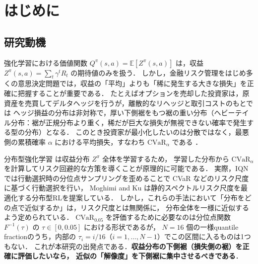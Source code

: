 \documentclass[a4paper,10pt]{jsarticle}
\theoremstyle{definition}
\newcommand{\CVaR}{\mathrm{CVaR}}
\newcommand{\Finv}{F^{-1}}
\newcommand{\E}{\mathbb{E}}
\begin{document}
\section{はじめに}
\label{sec:intro}

\subsection{研究動機}
強化学習における価値関数 $Q^\pi(s,a)=\E[Z^\pi(s,a)]$ は，収益 $Z^\pi(s,a)=\sum_t\gamma^t R_t$ の期待値のみを扱う．
しかし，金融リスク管理をはじめ多くの意思決定問題では，収益の「平均」よりも「稀に発生する大きな損失」を正確に把握することが重要である．
たとえばオプションを売却した投資家は，原資産を売買してデルタヘッジを行うが，離散的なリヘッジと取引コストのもとでは
ヘッジ損益の分布は非対称で，厚い下側裾をもつ裾の重い分布（ヘビーテイル分布：裾が正規分布より重く，稀だが巨大な損失が無視できない確率で発生する型の分布）となる．
このとき投資家が最小化したいのは分散ではなく，最悪側の累積確率 $\alpha$ における平均損失，すなわち $\CVaR_\alpha$ である \cite{rockafellar2000cvar}．

分布型強化学習 \cite{bellemare2017c51,dabney2018qrdqn,dabney2018iqn,yang2019fqf} は収益分布 $Z^\pi$ 全体を学習するため，
学習した分布から $\CVaR_\alpha$ を計算してリスク回避的な方策を導くことが原理的に可能である．
実際，IQN \cite{dabney2018iqn} では行動選択時の分位点サンプリングを歪めることで CVaR などのリスク尺度に基づく行動選択を行い，
Moghimi and Ku \cite{moghimi2025beyond} は静的スペクトルリスク尺度を最適化する分布型RLを提案している．
しかし，これらの手法において「分布をどの点で近似するか」は，リスク尺度とは無関係に，
分布全体を一様に近似するよう定められている．
$\CVaR_{0.05}$ を評価するために必要なのは分位点関数 $\Finv(\tau)$ の $\tau\in[0,0.05]$ における形状であるが，
$N=16$ 個の一様quantile fractionのうち，内部の $\tau_i=i/16$（$i=1,\dots,N-1$）でこの区間に入るものは1つもない．
これが本研究の出発点である．\textbf{収益分布の下側裾（損失側の裾）を正確に評価したいなら，
近似の「解像度」を下側裾に集中させるべきである}．
\end{document}
